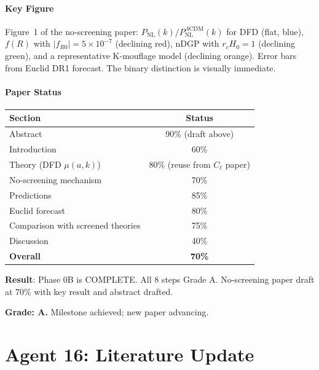 \documentclass[11pt,a4paper]{article}
\begin{document}
\subsection{Key Figure}

Figure~1 of the no-screening paper: $P_{\mathrm{NL}}(k)/P_{\mathrm{NL}}^{\Lambda\mathrm{CDM}}(k)$ for DFD (flat, blue), $f(R)$ with $|f_{R0}| = 5 \times 10^{-7}$ (declining red), nDGP with $r_c H_0 = 1$ (declining green), and a representative K-mouflage model (declining orange). Error bars from Euclid DR1 forecast. The binary distinction is visually immediate.

\subsection{Paper Status}

\begin{center}
\begin{tabular}{lc}
\toprule
\textbf{Section} & \textbf{Status} \\
\midrule
Abstract & 90\% (draft above) \\
Introduction & 60\% \\
Theory (DFD $\mu(a,k)$) & 80\% (reuse from $C_\ell$ paper) \\
No-screening mechanism & 70\% \\
Predictions & 85\% \\
Euclid forecast & 80\% \\
Comparison with screened theories & 75\% \\
Discussion & 40\% \\
\midrule
\textbf{Overall} & \textbf{70\%} \\
\bottomrule
\end{tabular}
\end{center}

\begin{tcolorbox}[colback=green!5!white, colframe=green!60!black, title={Agent 15: Phase 0B 8/8 COMPLETE + No-Screening Paper at 70\%}]
\textbf{Result}: Phase 0B is COMPLETE. All 8 steps Grade A. No-screening paper draft at 70\% with key result and abstract drafted.

\textbf{Grade: A.} Milestone achieved; new paper advancing.
\end{tcolorbox}


\part{Agent 16: Literature Update}
\label{part:literature}
\end{document}
